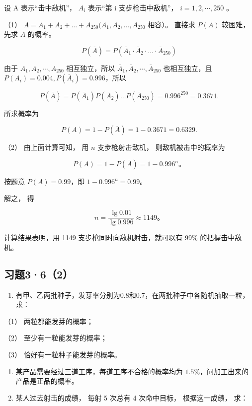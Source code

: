  设 A 表示``击中敌机''， \(A_{i}\) 表示``第 i
支步枪击中敌机''， \(i=1,2,\cdots,250\) 。

（1）
\(A = A_{1} + A_{2} + \dots + A_{250}(A_{1}, A_{2}, \dots, A_{250}\)
相容）。 直接求 \(P(A)\) 较困难， 先求 \(\overline{A}\) 的概率。

\[
P (\overline {{{A}}}) = P (\overline {{{A}}} _ {1} \cdot \overline {{{A}}} _ {2} \cdot \dots \cdot \overline {{{A}}} _ {250})
\]

由于 \(A_{1}, A_{2}, \cdots, A_{250}\) 相互独立，所以
\(\overline{A}_{1}, \overline{A}_{2}, \cdots, \overline{A}_{250}\)
也相互独立，且 \(P(A_{i}) = 0.004, P(\overline{A}_{i}) = 0.996\)，所以

\[
P (\overline {{{A}}}) = P (\overline {{{A}}} _ {1}) P (\overline {{{A}}} _ {2}) \dots P (\overline {{{A}}} _ {250}) = 0.996 ^ {250} = 0.3671.
\]

所求概率为

\[
P (A) = 1 - P (\overline {{{A}}}) = 1 - 0.3671 = 0.6329.
\]

（2） 由上面计算可知， 用 \(n\) 支步枪射击敌机， 则敌机被击中的概率为

\[
P(A)=1-P(\overline A)=1-0.996^n\text{。}
\]

按题意 \(P(A) = 0.99\)，即 \(1-0.996^n=0.99\)。

解之， 得

\[
n=\frac{\lg0.01}{\lg0.996}\approx1149\text{。}
\]

计算结果表明，用 1149 支步枪同时向敌机射击，就可以有 99\%
的把握击中敌机。

\subsection{习题3·6（2）}

\begin{enumerate}
\item
  有甲、乙两批种子，发芽率分别为0.8和0.7，在两批种子中各随机抽取一粒，求：
\end{enumerate}

（1） 两粒都能发芽的概率；

（2） 至少有一粒能发芽的概率；

（3） 恰好有一粒种子能发芽的概率。

\begin{enumerate}[start=2]
\item
  某产品需要经过三道工序，每道工序不合格的概率均为
  \(1.5\%\)，问加工出来的产品是正品的概率。
\item
  某人过去射击的成绩， 每射 5 次总有 4 次命中目标， 根据这一成绩， 求：
\end{enumerate}

